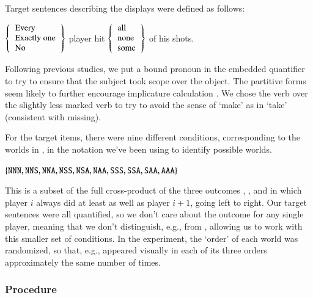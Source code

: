 \documentclass[leqno,12pt]{article}
\begin{document}
Target sentences describing the displays were defined as follows:
%
\begin{examples}
\item\label{expmsgs} 
  $\set{
      \begin{tabular}[c]{l}
        Every \\
        Exactly one \\
        No 
      \end{tabular}}$
    player hit 
    $\set{
      \begin{tabular}[c]{l}
        all \\
        none \\
        some 
      \end{tabular}}$
    of his shots.  
\end{examples}
%
Following previous studies, we put a bound pronoun in the embedded
quantifier to try to ensure that the subject took scope over the
object. The partitive forms seem likely to further encourage
implicature calculation \citep{reed:1991-interpreting,Grodner-etal:2010,degen:inpress-SP}. We chose the verb
 over the slightly less marked verb  to try to
avoid the sense of `make' as in `take' (consistent with missing).

For the target items, there were nine different conditions,
corresponding to the worlds in , in the notation we've been
using to identify possible worlds.
%
\begin{examples}
\item\label{conds} $\left\{ \texttt{NNN}, \texttt{NNS}, \texttt{NNA},
    \texttt{NSS}, \texttt{NSA}, \texttt{NAA}, \texttt{SSS}, \texttt{SSA},
    \texttt{SAA}, \texttt{AAA} \right\}$
\end{examples}
%
This is a subset of the full cross-product of the three outcomes
, , and  in which player $i$ always did at
least as well as player $i+1$, going left to right.  Our target
sentences were all quantified, so we don't care about the outcome for
any single player, meaning that we don't distinguish, e.g.,
 from , allowing us to work with this smaller
set of conditions. In the experiment, the `order' of each world was
randomized, so that, e.g.,  appeared visually in each of
its three orders approximately the same number of times.

\subsubsection{Procedure} 
\end{document}
